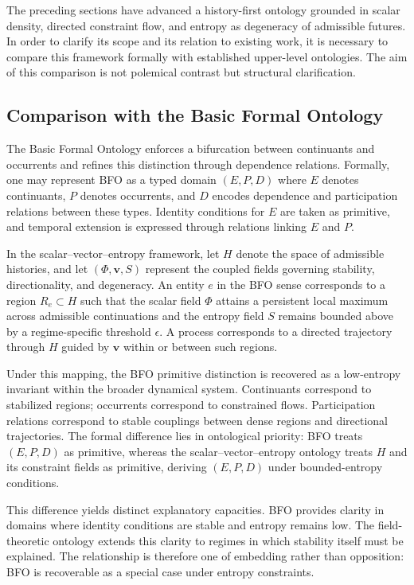 \documentclass[12pt]{article}
\begin{document}
The preceding sections have advanced a history-first ontology grounded in scalar density, directed constraint flow, and entropy as degeneracy of admissible futures. In order to clarify its scope and its relation to existing work, it is necessary to compare this framework formally with established upper-level ontologies. The aim of this comparison is not polemical contrast but structural clarification.

\subsection{Comparison with the Basic Formal Ontology}

The Basic Formal Ontology enforces a bifurcation between continuants and occurrents and refines this distinction through dependence relations. Formally, one may represent BFO as a typed domain $(E, P, D)$ where $E$ denotes continuants, $P$ denotes occurrents, and $D$ encodes dependence and participation relations between these types. Identity conditions for $E$ are taken as primitive, and temporal extension is expressed through relations linking $E$ and $P$.

In the scalar–vector–entropy framework, let $H$ denote the space of admissible histories, and let $(\Phi, \mathbf{v}, S)$ represent the coupled fields governing stability, directionality, and degeneracy. An entity $e$ in the BFO sense corresponds to a region $R_e \subset H$ such that the scalar field $\Phi$ attains a persistent local maximum across admissible continuations and the entropy field $S$ remains bounded above by a regime-specific threshold $\epsilon$. A process corresponds to a directed trajectory through $H$ guided by $\mathbf{v}$ within or between such regions.

Under this mapping, the BFO primitive distinction is recovered as a low-entropy invariant within the broader dynamical system. Continuants correspond to stabilized regions; occurrents correspond to constrained flows. Participation relations correspond to stable couplings between dense regions and directional trajectories. The formal difference lies in ontological priority: BFO treats $(E, P, D)$ as primitive, whereas the scalar–vector–entropy ontology treats $H$ and its constraint fields as primitive, deriving $(E, P, D)$ under bounded-entropy conditions.

This difference yields distinct explanatory capacities. BFO provides clarity in domains where identity conditions are stable and entropy remains low. The field-theoretic ontology extends this clarity to regimes in which stability itself must be explained. The relationship is therefore one of embedding rather than opposition: BFO is recoverable as a special case under entropy constraints.
\end{document}
